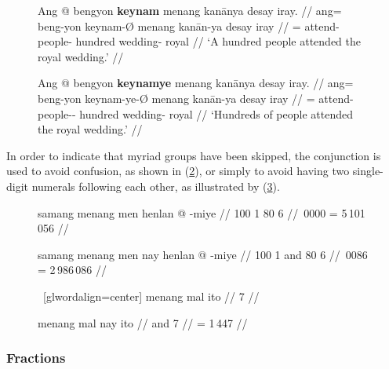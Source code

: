\begin{figure}[h]
\pex\label{ex:keynampltant}
\a\label{ex:keynamunmkd}\begingl
	\gla Ang @ bengyon \textbf{keynam} menang kanānya {desay iray}. //
	\glb ang= beng-yon keynam-Ø menang kanān-ya {desay iray} //
	\glc \AgtT{}= attend-\TplN{} people-\Top{} hundred wedding-\Loc{} 
		royal //
	\glft `A hundred people attended the royal wedding.' //
\endgl

\a\label{ex:keynammkd}\begingl
	\gla Ang @ bengyon \textbf{keynamye} menang kanānya {desay iray}. //
	\glb ang= beng-yon keynam-ye-Ø menang kanān-ya {desay iray} //
	\glc \AgtT{}= attend-\TplN{} people-\Pl{}-\Top{} hundred wedding-\Loc{} 
		royal //
	\glft `Hundreds of people attended the royal wedding.' //
\endgl
\xe
\end{figure}

In order to indicate that myriad groups have been skipped, the conjunction
 is used to avoid confusion, as shown in
(\ref{ex:numconfuse}), or simply to avoid having two single-digit numerals
following each other, as illustrated by (\ref{ex:numsgldig}).

\begin{figure}[h]
\pex[glwordalign=center]\label{ex:numconfuse}
\a\begingl
	\gla samang menang men henlan @ -miye //
	 {100} {1} {80} {6} //
	\,0000 = 5\,101\,056 //
\endgl

\a\begingl
	\gla samang menang men nay henlan @ -miye //
	 {100} {1} and {80} {6} //
	\,0086 = 2\,986\,086 //
\endgl
\xe
\end{figure}

\begin{figure}[h]
\pex~[glwordalign=center]\label{ex:numsgldig}
\a\ljudge\ques\begingl
	\gla menang mal ito //
	 {\ten} {7} //
\endgl

\a\begingl
	\gla menang mal nay ito //
	 {\ten} and {7} //
	\glft {} = 1\,447 //
\endgl
\xe
\end{figure}


\subsubsection{Fractions}

